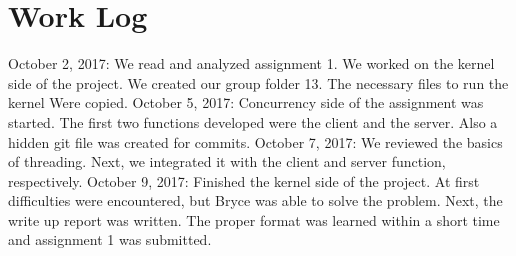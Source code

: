 \documentclass{article}
\begin{document}
\section*{Work Log}
October 2, 2017: We read and analyzed assignment 1. We worked on the kernel side of the project. We created our group folder 13. The necessary files to run the kernel Were copied.
\newline
October 5, 2017: Concurrency side of the assignment was started. The first two functions developed were the client and the server. Also a hidden git file was created for commits.
\newline
October 7, 2017: We reviewed the basics of threading. Next, we integrated it with the client and server function, respectively. 
\newline
October 9, 2017: Finished the kernel side of the project. At first difficulties were encountered, but Bryce was able to solve the problem. Next, the write up report was written. The proper format was learned within a short time and assignment 1 was submitted.  

\end{document}
